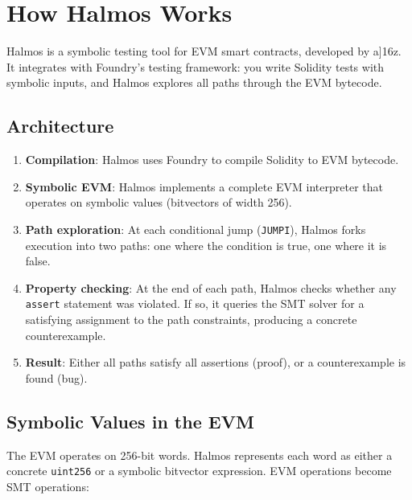 \documentclass[11pt,a4paper]{article}
\begin{document}
\section{How Halmos Works}

Halmos is a symbolic testing tool for EVM smart contracts, developed by a]16z. It
integrates with Foundry's testing framework: you write Solidity tests with symbolic inputs,
and Halmos explores all paths through the EVM bytecode.

\subsection{Architecture}

\begin{enumerate}
  \item \textbf{Compilation}: Halmos uses Foundry to compile Solidity to EVM bytecode.
  \item \textbf{Symbolic EVM}: Halmos implements a complete EVM interpreter that operates
    on symbolic values (bitvectors of width 256).
  \item \textbf{Path exploration}: At each conditional jump (\texttt{JUMPI}), Halmos forks
    execution into two paths: one where the condition is true, one where it is false.
  \item \textbf{Property checking}: At the end of each path, Halmos checks whether any
    \texttt{assert} statement was violated. If so, it queries the SMT solver for a
    satisfying assignment to the path constraints, producing a concrete counterexample.
  \item \textbf{Result}: Either all paths satisfy all assertions (proof), or a
    counterexample is found (bug).
\end{enumerate}

\subsection{Symbolic Values in the EVM}

The EVM operates on 256-bit words. Halmos represents each word as either a concrete
\texttt{uint256} or a symbolic bitvector expression. EVM operations become SMT operations:
\end{document}
